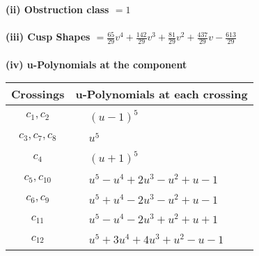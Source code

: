 \documentclass[1p]{elsarticle_modified}
\theoremstyle{definition}
\begin{document}
\flushleft \textbf{(ii) Obstruction class $= 1$}\\~\\
\flushleft \textbf{(iii) Cusp Shapes $= \frac{65}{29} v^4+\frac{142}{29} v^3+\frac{81}{29} v^2+\frac{437}{29} v-\frac{613}{29}$}\\~\\
\newpage\renewcommand{\arraystretch}{1}
\flushleft \textbf{(iv) u-Polynomials at the component}\newline \\
\begin{tabular}{m{50pt}|m{274pt}}
Crossings & \hspace{64pt}u-Polynomials at each crossing \\
\hline $$\begin{aligned}c_{1},c_{2}\end{aligned}$$&$\begin{aligned}
&(u-1)^5
\end{aligned}$\\
\hline $$\begin{aligned}c_{3},c_{7},c_{8}\end{aligned}$$&$\begin{aligned}
&u^5
\end{aligned}$\\
\hline $$\begin{aligned}c_{4}\end{aligned}$$&$\begin{aligned}
&(u+1)^5
\end{aligned}$\\
\hline $$\begin{aligned}c_{5},c_{10}\end{aligned}$$&$\begin{aligned}
&u^5- u^4+2 u^3- u^2+u-1
\end{aligned}$\\
\hline $$\begin{aligned}c_{6},c_{9}\end{aligned}$$&$\begin{aligned}
&u^5+u^4-2 u^3- u^2+u-1
\end{aligned}$\\
\hline $$\begin{aligned}c_{11}\end{aligned}$$&$\begin{aligned}
&u^5- u^4-2 u^3+u^2+u+1
\end{aligned}$\\
\hline $$\begin{aligned}c_{12}\end{aligned}$$&$\begin{aligned}
&u^5+3 u^4+4 u^3+u^2- u-1
\end{aligned}$\\
\hline
\end{tabular}\\~\\
\end{document}
